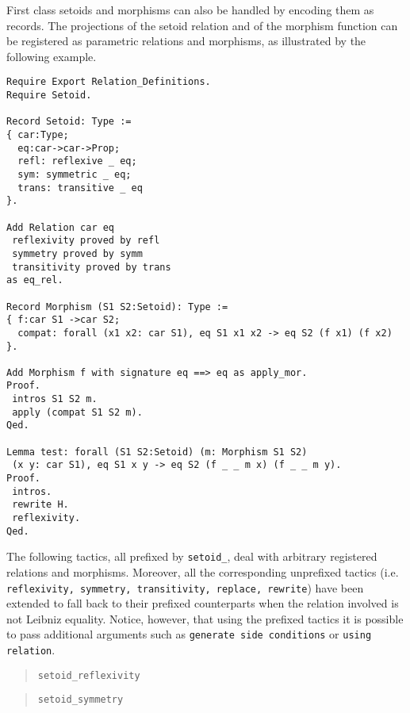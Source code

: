 First class setoids and morphisms can also be handled by encoding them
as records. The projections of the setoid relation and of the morphism
function can be registered as parametric relations and morphisms, as
illustrated by the following example.
\begin{cscexample}
\begin{verbatim}
Require Export Relation_Definitions.
Require Setoid.

Record Setoid: Type :=
{ car:Type;
  eq:car->car->Prop;
  refl: reflexive _ eq;
  sym: symmetric _ eq;
  trans: transitive _ eq
}.

Add Relation car eq
 reflexivity proved by refl
 symmetry proved by symm
 transitivity proved by trans
as eq_rel.

Record Morphism (S1 S2:Setoid): Type :=
{ f:car S1 ->car S2;
  compat: forall (x1 x2: car S1), eq S1 x1 x2 -> eq S2 (f x1) (f x2)
}.

Add Morphism f with signature eq ==> eq as apply_mor.
Proof.
 intros S1 S2 m.
 apply (compat S1 S2 m).
Qed.

Lemma test: forall (S1 S2:Setoid) (m: Morphism S1 S2)
 (x y: car S1), eq S1 x y -> eq S2 (f _ _ m x) (f _ _ m y).
Proof.
 intros.
 rewrite H.
 reflexivity.
Qed.
\end{verbatim}
\end{cscexample}

\label{setoidtactics}
The following tactics, all prefixed by \texttt{setoid\_}, 
deal with arbitrary
registered relations and morphisms. Moreover, all the corresponding unprefixed
tactics (i.e. \texttt{reflexivity, symmetry, transitivity, replace, rewrite})
have been extended to fall back to their prefixed counterparts when
the relation involved is not Leibniz equality. Notice, however, that using
the prefixed tactics it is possible to pass additional arguments such as
\texttt{generate side conditions} or \texttt{using relation}.

\begin{quote}
  \texttt{setoid\_reflexivity}
\end{quote}

\begin{quote}
  \texttt{setoid\_symmetry}
  \\
\end{quote}

